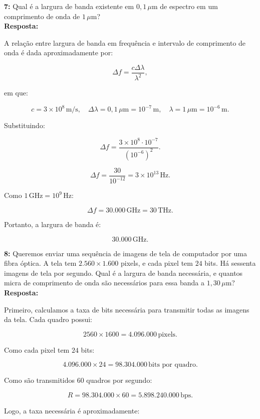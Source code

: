 \documentclass[12pt,a4paper]{report}
\begin{document}
\vspace{0.6cm}

\noindent \textbf{7:} Qual é a largura de banda existente em $0{,}1\,\mu\text{m}$ de espectro em um comprimento de onda de $1\,\mu\text{m}$?\\
\textbf{Resposta:}

A relação entre largura de banda em frequência e intervalo de comprimento de onda é dada aproximadamente por:

\[
\Delta f = \frac{c\Delta \lambda}{\lambda^2},
\]

em que:

\[
c = 3 \times 10^8\,\text{m/s}, \quad \Delta \lambda = 0{,}1\,\mu\text{m} = 10^{-7}\,\text{m}, \quad \lambda = 1\,\mu\text{m} = 10^{-6}\,\text{m}.
\]

Substituindo:

\[
\Delta f = \frac{3 \times 10^8 \cdot 10^{-7}}{(10^{-6})^2}.
\]

\[
\Delta f = \frac{30}{10^{-12}} = 3 \times 10^{13}\,\text{Hz}.
\]

Como $1\,\text{GHz}=10^9\,\text{Hz}$:

\[
\Delta f = 30.000\,\text{GHz} = 30\,\text{THz}.
\]

Portanto, a largura de banda é:

\[
\boxed{30.000\,\text{GHz}}.
\]


\vspace{0.6cm}

\noindent \textbf{8:} Queremos enviar uma sequência de imagens de tela de computador por uma fibra óptica. A tela tem $2.560 \times 1.600$ pixels, e cada pixel tem $24$ bits. Há sessenta imagens de tela por segundo. Qual é a largura de banda necessária, e quantos micra de comprimento de onda são necessários para essa banda a $1{,}30\,\mu\text{m}$?\\
\textbf{Resposta:}

Primeiro, calculamos a taxa de bits necessária para transmitir todas as imagens da tela. Cada quadro possui:

\[
2560 \times 1600 = 4.096.000\,\text{pixels}.
\]

Como cada pixel tem $24$ bits:

\[
4.096.000 \times 24 = 98.304.000\,\text{bits por quadro}.
\]

Como são transmitidos $60$ quadros por segundo:

\[
R = 98.304.000 \times 60 = 5.898.240.000\,\text{bps}.
\]

Logo, a taxa necessária é aproximadamente:
\end{document}
